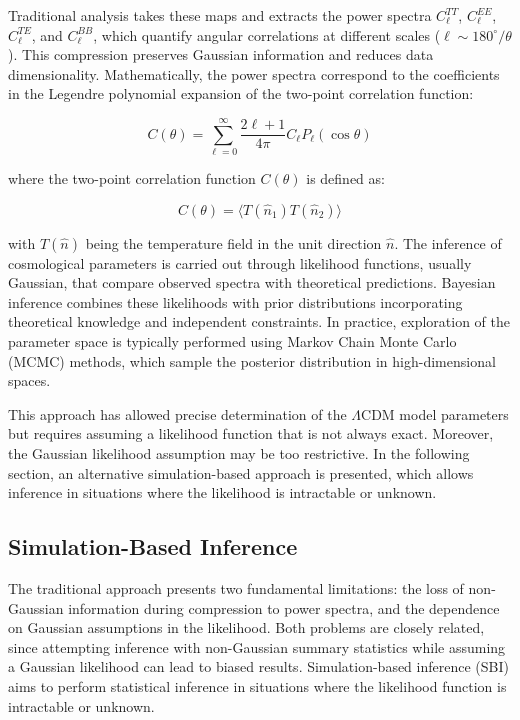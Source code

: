 Traditional analysis takes these maps and extracts the power spectra \(C_{\ell}^{TT}\), \(C_{\ell}^{EE}\), \(C_{\ell}^{TE}\), and \(C_{\ell}^{BB}\), which quantify angular correlations at different scales (\(\ell \sim 180^\circ/\theta\)). This compression preserves Gaussian information and reduces data dimensionality. Mathematically, the power spectra correspond to the coefficients in the Legendre polynomial expansion of the two-point correlation function:

\begin{equation}
C(\theta)=\sum_{\ell=0}^{\infty}\frac{2\ell+1}{4\pi}C_{\ell}P_{\ell}(\cos \theta)
\end{equation}

where the two-point correlation function \(C(\theta)\) is defined as:

\begin{equation}
C(\theta)=\langle T(\hat{n}_1)T(\hat{n}_2) \rangle
\end{equation}

with \(T(\hat{n})\) being the temperature field in the unit direction \(\hat{n}\). The inference of cosmological parameters is carried out through likelihood functions, usually Gaussian, that compare observed spectra with theoretical predictions. Bayesian inference combines these likelihoods with prior distributions incorporating theoretical knowledge and independent constraints. In practice, exploration of the parameter space is typically performed using Markov Chain Monte Carlo (MCMC) methods, which sample the posterior distribution in high-dimensional spaces.

This approach has allowed precise determination of the \(\Lambda\)CDM model parameters but requires assuming a likelihood function that is not always exact. Moreover, the Gaussian likelihood assumption may be too restrictive. In the following section, an alternative simulation-based approach is presented, which allows inference in situations where the likelihood is intractable or unknown.

\subsection{Simulation-Based Inference}
The traditional approach presents two fundamental limitations: the loss of non-Gaussian information during compression to power spectra, and the dependence on Gaussian assumptions in the likelihood. Both problems are closely related, since attempting inference with non-Gaussian summary statistics while assuming a Gaussian likelihood can lead to biased results. Simulation-based inference (SBI) aims to perform statistical inference in situations where the likelihood function is intractable or unknown.

